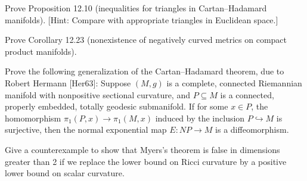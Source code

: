 \begin{exercise}
\label{prob:triangle-inequalities-cartan-hadamard}
Prove Proposition 12.10 (inequalities for triangles in Cartan--Hadamard manifolds). [Hint: Compare with appropriate triangles in Euclidean space.]
\end{exercise}

\begin{exercise}
\label{prob:no-negative-curvature-compact-products}
Prove Corollary 12.23 (nonexistence of negatively curved metrics on compact product manifolds).
\end{exercise}

\begin{exercise}
\label{prob:cartan-hadamard-generalization}
Prove the following generalization of the Cartan--Hadamard theorem, due to Robert Hermann [Her63]: Suppose $(M,g)$ is a complete, connected Riemannian manifold with nonpositive sectional curvature, and $P \subseteq M$ is a connected, properly embedded, totally geodesic submanifold. If for some $x \in P$, the homomorphism $\pi_1(P,x) \to \pi_1(M,x)$ induced by the inclusion $P \hookrightarrow M$ is surjective, then the normal exponential map $E : NP \to M$ is a diffeomorphism.
\end{exercise}

\begin{exercise}\label{prob:myers-scalar-counterexample}
Give a counterexample to show that Myers's theorem is false in dimensions greater than 2 if we replace the lower bound on Ricci curvature by a positive lower bound on scalar curvature.
\end{exercise}

